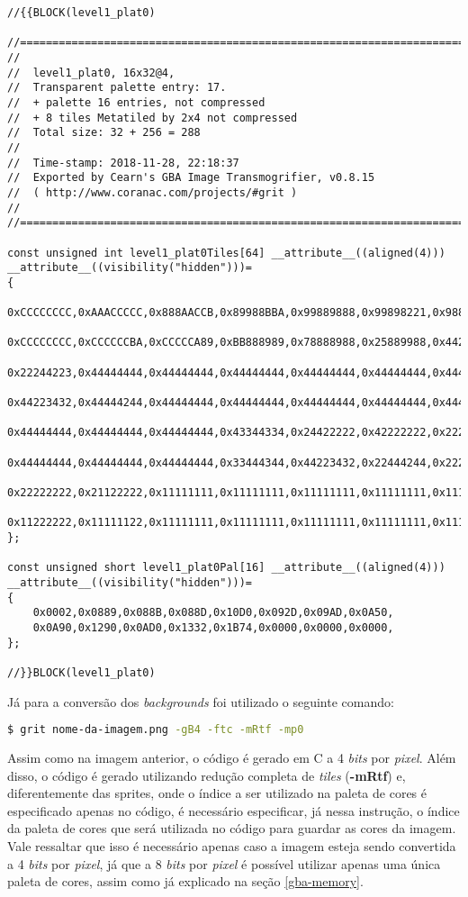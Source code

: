 \begin{lstlisting}[caption={\textit{Código fonte} da parte superior da imagem da plataforma da primeira fase.},label={lst:imagecpp}]
//{{BLOCK(level1_plat0)

//======================================================================
//
//  level1_plat0, 16x32@4,
//  Transparent palette entry: 17.
//  + palette 16 entries, not compressed
//  + 8 tiles Metatiled by 2x4 not compressed
//  Total size: 32 + 256 = 288
//
//  Time-stamp: 2018-11-28, 22:18:37
//  Exported by Cearn's GBA Image Transmogrifier, v0.8.15
//  ( http://www.coranac.com/projects/#grit )
//
//======================================================================

const unsigned int level1_plat0Tiles[64] __attribute__((aligned(4))) __attribute__((visibility("hidden")))=
{
    0xCCCCCCCC,0xAAACCCCC,0x888AACCB,0x89988BBA,0x99889888,0x99898221,0x98822222,0x81122444,
    0xCCCCCCCC,0xCCCCCCBA,0xCCCCCA89,0xBB888989,0x78888988,0x25889988,0x44225889,0x22444168,
    0x22244223,0x44444444,0x44444444,0x44444444,0x44444444,0x44444444,0x44444444,0x44444444,
    0x44223432,0x44444244,0x44444444,0x44444444,0x44444444,0x44444444,0x44444444,0x44444444,
    0x44444444,0x44444444,0x44444444,0x43344334,0x24422222,0x42222222,0x22222222,0x22222222,
    0x44444444,0x44444444,0x44444444,0x33444344,0x44223432,0x22444244,0x22222222,0x11222222,
    0x22222222,0x21122222,0x11111111,0x11111111,0x11111111,0x11111111,0x11111111,0x11111111,
    0x11222222,0x11111122,0x11111111,0x11111111,0x11111111,0x11111111,0x11111111,0x11111111,
};

const unsigned short level1_plat0Pal[16] __attribute__((aligned(4))) __attribute__((visibility("hidden")))=
{
    0x0002,0x0889,0x088B,0x088D,0x10D0,0x092D,0x09AD,0x0A50,
    0x0A90,0x1290,0x0AD0,0x1332,0x1B74,0x0000,0x0000,0x0000,
};

//}}BLOCK(level1_plat0)
\end{lstlisting}

Já para a conversão dos \textit{backgrounds} foi utilizado o seguinte comando:

\begin{lstlisting}[language=bash,caption={Comando para conversão dos \textit{backgrounds} em código}]
$ grit nome-da-imagem.png -gB4 -ftc -mRtf -mp0
\end{lstlisting}

Assim como na imagem anterior, o código é gerado em C a 4 \textit{bits} por \textit{pixel}. Além disso, o código é gerado utilizando redução completa de \textit{tiles} (\textbf{-mRtf}) e, diferentemente das sprites, onde o índice a ser utilizado na paleta de cores é especificado apenas no código, é necessário especificar, já nessa instrução, o índice da paleta de cores que será utilizada no código para guardar as cores da imagem. Vale ressaltar que isso é necessário apenas caso a imagem esteja sendo convertida a 4 \textit{bits} por \textit{pixel}, já que a 8 \textit{bits} por \textit{pixel} é possível utilizar apenas uma única paleta de cores, assim como já explicado na seção \ref{gba-memory}.




